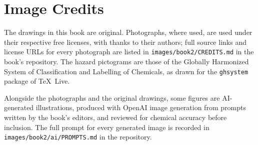 \chapter*{Image Credits}

The drawings in this book are original. Photographs, where used, are used
under their respective free licenses, with thanks to their authors; full
source links and license URLs for every photograph are listed in
\texttt{images/book2/CREDITS.md} in the book's repository.
The hazard pictograms are those of the Globally Harmonized System of
Classification and Labelling of Chemicals, as drawn for the
\texttt{ghsystem} package of \TeX\ Live.

\bigskip
Alongside the photographs and the original drawings, some figures are
AI-generated illustrations, produced with OpenAI image generation from
prompts written by the book's editors, and reviewed for chemical
accuracy before inclusion. The full prompt for every generated image is
recorded in \texttt{images/book2/ai/PROMPTS.md} in the repository.

